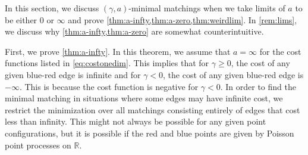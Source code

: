 \documentclass{article}
\newcommand{\R}{\mathbb{R}}
\begin{document}
In this section, we discuss $(\gamma,a)$-minimal matchings when we take limits
of $a$ to be either $0$ or $\infty$ and prove
\cref{thm:a-infty,thm:a-zero,thm:weirdlim}.
 In \cref{rem:lims}, we discuss why \cref{thm:a-infty,thm:a-zero} are
 somewhat counterintuitive.



First, we prove \cref{thm:a-infty}. In this theorem, we assume that
$a=\infty$ for the cost functions listed in \eqref{eq:costonedim}.
This implies that for $\gamma\geq 0$, the cost of any given blue-red
edge is infinite and for $\gamma<0$, the cost of any given blue-red
edge is $-\infty$. This is because the cost function is negative for
$\gamma<0$.
In order to find the minimal matching in situations where some edges
may have infinite cost, we restrict the minimization over all
matchings consisting entirely of edges that cost less than infinity.
This might not always be possible for any given point configurations,
but it is possible if the red and blue points are given by Poisson
point processes on $\R$.
\end{document}
